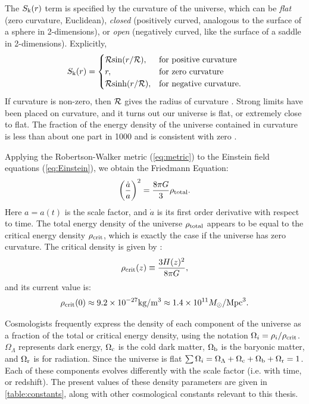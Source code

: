 The $S_{\rm k}(r)$ term is specified by the curvature of the universe, which can be {\it flat} (zero curvature, Euclidean), {\it closed} (positively curved, analogous to the surface of a sphere in 2-dimensions), or {\it open} (negatively curved, like the surface of a saddle in 2-dimensions). Explicitly,
\begin{equation}
S_{\rm k}(r) = 
    \begin{cases}
        {\cal R}{\rm sin}(r/{\cal R}), & \text{for positive curvature} \\
        r,              & \text{for zero curvature} \\
        {\cal R}{\rm sinh}(r/{\cal R}), & \text{for negative curvature.}
    \end{cases}
\end{equation}
If curvature is non-zero, then $\cal R$ gives the radius of curvature \citep{RydenText}. Strong limits have been placed on curvature, and it turns out our universe is flat, or extremely close to flat. The fraction of the energy density of the universe contained in curvature is less than about one part in 1000 and is consistent with zero \citep{PlanckXVI}.

Applying the Robertson-Walker metric (\autoref{eq:metric}) to the Einstein field equations (\autoref{eq:Einstein}), we obtain the Friedmann Equation:
\begin{equation}
\left( \frac{\dot a}{a} \right)^2 = \frac{8\pi G}{3} \rho_{\rm total}.
\end{equation}
Here $a=a(t)$ is the scale factor, and $\dot a$ is its first order derivative with respect to time. The total energy density of the universe $\rho_{\rm total}$ appears to be equal to the critical energy density $\rho_{\rm crit}$, which is exactly the case if the universe has zero curvature. The critical density is given by \citep{RydenText}:
\begin{equation}
\rho_{\rm crit}(z) \equiv \frac{3H(z)^2}{8\pi G},
\end{equation}
and its current value is:
\begin{equation}
\rho_{\rm crit}(0) \approx 9.2 \times 10^{-27} {\rm kg}/{\rm m}^{3} \approx 1.4 \times 10^{11} M_{\odot}/{\rm Mpc}^{3}.
\end{equation}

Cosmologists frequently express the density of each component of the universe as a fraction of the total or critical energy density, using the notation $\Omega_i = \rho_i / \rho_{\rm crit}$. $\Omega_{\Lambda}$ represents dark energy, $\Omega_{\rm c}$ is the cold dark matter, $\Omega_{\rm b}$ is the baryonic matter, and $\Omega_{\rm r}$ is for radiation. Since the universe is flat $\sum \Omega_i = \Omega_{\Lambda} + \Omega_{\rm c} + \Omega_{\rm b} + \Omega_{\rm r} =1$. Each of these components evolves differently with the scale factor (i.e. with time, or redshift). The present values of these density parameters are given in \autoref{table:constants}, along with other cosmological constants relevant to this thesis.


